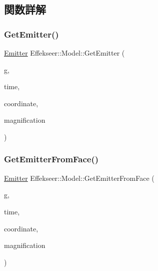 \subsection{関数詳解}
\mbox{\label{class_effekseer_1_1_model_a42ec48630c9d7f8d0232777102bffe9a}} 
\subsubsection{\texorpdfstring{Get\+Emitter()}{GetEmitter()}}
{\footnotesize\ttfamily \mbox{\hyperlink{struct_effekseer_1_1_model_1_1_emitter}{Emitter}} Effekseer\+::\+Model\+::\+Get\+Emitter (\begin{DoxyParamCaption}\item[{\mbox{\hyperlink{class_effekseer_1_1_i_rand_object}{I\+Rand\+Object}} $\ast$}]{g,  }\item[{int32\+\_\+t}]{time,  }\item[{\mbox{\hyperlink{namespace_effekseer_ac8508f8823c5fcf36aac5d2ddee23765}{Coordinate\+System}}}]{coordinate,  }\item[{float}]{magnification }\end{DoxyParamCaption})\hspace{0.3cm}{\ttfamily [inline]}}

\mbox{\label{class_effekseer_1_1_model_aef7548be4adad150a7f573ac977d89c7}} 
\subsubsection{\texorpdfstring{Get\+Emitter\+From\+Face()}{GetEmitterFromFace()}\hspace{0.1cm}{\footnotesize\ttfamily [1/2]}}
{\footnotesize\ttfamily \mbox{\hyperlink{struct_effekseer_1_1_model_1_1_emitter}{Emitter}} Effekseer\+::\+Model\+::\+Get\+Emitter\+From\+Face (\begin{DoxyParamCaption}\item[{\mbox{\hyperlink{class_effekseer_1_1_i_rand_object}{I\+Rand\+Object}} $\ast$}]{g,  }\item[{int32\+\_\+t}]{time,  }\item[{\mbox{\hyperlink{namespace_effekseer_ac8508f8823c5fcf36aac5d2ddee23765}{Coordinate\+System}}}]{coordinate,  }\item[{float}]{magnification }\end{DoxyParamCaption})\hspace{0.3cm}{\ttfamily [inline]}}

